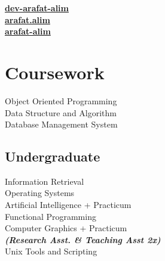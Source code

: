 \documentclass[]{deedy-resume-openfont}
\begin{document}
\begin{minipage}[t]{1.0\textwidth}
\href{https://dev-arafat.netlify.app/#contact}{\faComments  \hspace{0.5em} \bf dev-arafat-alim} \\
\href{https://github.com/arafat-alim}{\faGithub \hspace{0.5em} \bf arafat.alim} \\
\href{https://www.linkedin.com/in/arafat-alim}{\faLinkedin \hspace{0.5em} \bf arafat-alim} \\


\section{Coursework}
\textbullet{} Object Oriented Programming \\
\textbullet{} Data Structure and Algorithm \\
\textbullet{} Database Management System
\sectionsep

\subsection{Undergraduate}
Information Retrieval \\
Operating Systems \\
Artificial Intelligence + Practicum \\
Functional Programming \\
Computer Graphics + Practicum \\
{\footnotesize \textit{\textbf{(Research Asst. \& Teaching Asst 2x) }}} \\
Unix Tools and Scripting \\




\end{minipage}
\end{document}
